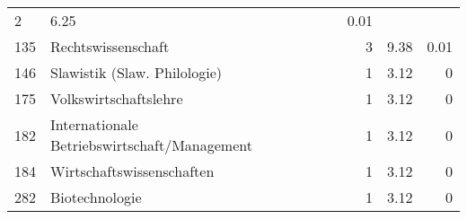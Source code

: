 \begin{longtable}{lXrrr}
       \num{2} &
       \num[round-mode=places,round-precision=2]{6,25} &
         \num[round-mode=places,round-precision=2]{0,01} \\

     135 &
     \multicolumn{1}{X}{ Rechtswissenschaft   } &


       \num{3} &
       \num[round-mode=places,round-precision=2]{9,38} &
         \num[round-mode=places,round-precision=2]{0,01} \\

     146 &
     \multicolumn{1}{X}{ Slawistik (Slaw. Philologie)   } &


       \num{1} &
       \num[round-mode=places,round-precision=2]{3,12} &
         \num[round-mode=places,round-precision=2]{0} \\

     175 &
     \multicolumn{1}{X}{ Volkswirtschaftslehre   } &


       \num{1} &
       \num[round-mode=places,round-precision=2]{3,12} &
         \num[round-mode=places,round-precision=2]{0} \\

     182 &
     \multicolumn{1}{X}{ Internationale Betriebswirtschaft/Management   } &


       \num{1} &
       \num[round-mode=places,round-precision=2]{3,12} &
         \num[round-mode=places,round-precision=2]{0} \\

     184 &
     \multicolumn{1}{X}{ Wirtschaftswissenschaften   } &


       \num{1} &
       \num[round-mode=places,round-precision=2]{3,12} &
         \num[round-mode=places,round-precision=2]{0} \\

     282 &
     \multicolumn{1}{X}{ Biotechnologie   } &


       \num{1} &
       \num[round-mode=places,round-precision=2]{3,12} &
         \num[round-mode=places,round-precision=2]{0} \\


\end{longtable}
